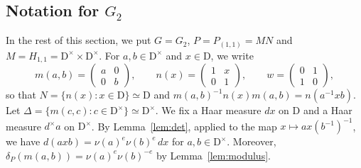 \documentclass[11pt]{amsart}
\numberwithin{equation}{section}
\theoremstyle{plain}
\theoremstyle{definition}
\theoremstyle{remark}
\begin{document}
\subsection{Notation for \texorpdfstring{$G_2$}{G2}}\label{ss:G2-notation}

In the rest of this section, we put $G=G_2$, $P=P_{(1,1)}=MN$ and $M=H_{1,1}=\mathrm{D}^\times\times \mathrm{D}^\times$. For $a,b\in \mathrm{D}^\times$ and $x\in \mathrm{D}$, we write
$$m(a,b)=\begin{pmatrix}a&0\\0&b\end{pmatrix},\qquad n(x)=\begin{pmatrix}1&x\\0&1\end{pmatrix},\qquad w=\begin{pmatrix}0&1\\1&0\end{pmatrix},$$
so that $N=\{n(x):x\in\mathrm{D}\}\simeq \mathrm{D}$ and $m(a,b)^{-1}n(x)m(a,b)=n(a^{-1}xb)$. Let $\Delta=\{m(c,c):c\in \mathrm{D}^\times\}\simeq \mathrm{D}^\times$. We fix a Haar measure $dx$ on $\mathrm{D}$ and a Haar measure $d^\times a$ on $\mathrm{D}^\times$. By Lemma~\ref{lem:det}, applied to the map $x\mapsto ax(b^{-1})^{-1}$, we have $d(axb)=\nu(a)^e\nu(b)^e\,dx$ for $a,b\in \mathrm{D}^\times$. Moreover, $\delta_P(m(a,b))=\nu(a)^e\nu(b)^{-e}$ by Lemma~\ref{lem:modulus}.
\end{document}
